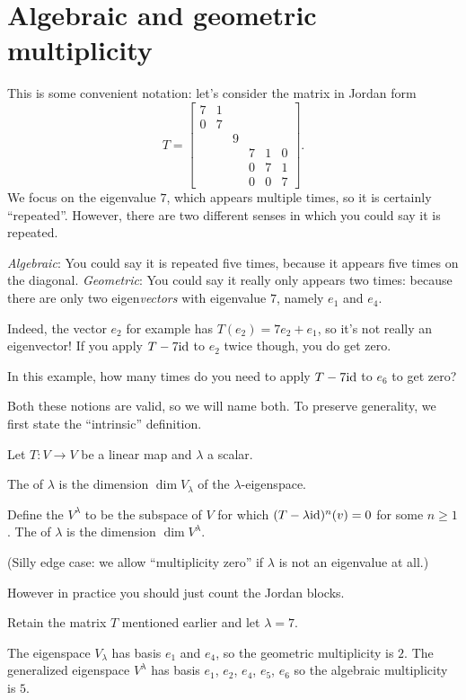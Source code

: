 \section{Algebraic and geometric multiplicity}
This is some convenient notation:
let's consider the matrix in Jordan form
\[
	T =
	\begin{bmatrix}
		7 & 1 \\
		0 & 7 \\
		& & 9 \\
		& & & 7 & 1 & 0 \\
		& & & 0 & 7 & 1 \\
		& & & 0 & 0 & 7
	\end{bmatrix}.
\]
We focus on the eigenvalue $7$,
which appears multiple times, so it is certainly ``repeated''.
However, there are two different senses in which you could say it is repeated.
\begin{itemize}
	\ii \emph{Algebraic}: You could say it is repeated five times,
	because it appears five times on the diagonal.
	\ii \emph{Geometric}: You could say it really only appears two times:
	because there are only two eigen\emph{vectors}
	with eigenvalue $7$, namely $e_1$ and $e_4$.

	Indeed, the vector $e_2$ for example has $T(e_2) = 7e_2 + e_1$,
	so it's not really an eigenvector!
	If you apply $T - 7\mathrm{id}$ to $e_2$ twice though,
	you do get zero.
\end{itemize}
\begin{ques}
	In this example,
	how many times do you need to apply $T - 7\mathrm{id}$ to $e_6$ to get zero?
\end{ques}
Both these notions are valid,
so we will name both.
To preserve generality,
we first state the ``intrinsic'' definition.
\begin{definition}
	Let $T \colon V \to V$ be a linear map and $\lambda$ a scalar.
	\begin{itemize}
		\ii The 
		of $\lambda$ is the dimension $\dim V_\lambda$
		of the $\lambda$-eigenspace.

		\ii Define the 
		$V^\lambda$ to be the subspace of $V$
		for which $(T-\lambda \mathrm{id})^n(v) = 0$ for some $n \ge 1$.
		The  of $\lambda$ is the
		dimension $\dim V^\lambda$.
	\end{itemize}
	(Silly edge case: we allow ``multiplicity zero''
	if $\lambda$ is not an eigenvalue at all.)
  \label{def:eigen_multiplicity}
\end{definition}
However in practice you should just count the Jordan blocks.
\begin{example}
	Retain the matrix $T$ mentioned earlier and let $\lambda = 7$.
	\begin{itemize}
		\ii The eigenspace $V_\lambda$ has basis $e_1$ and $e_4$,
		so the geometric multiplicity is $2$.
		\ii The generalized eigenspace $V^\lambda$ has basis $e_1$, $e_2$,
		$e_4$, $e_5$, $e_6$ so the algebraic multiplicity is $5$.
	\end{itemize}
\end{example}

